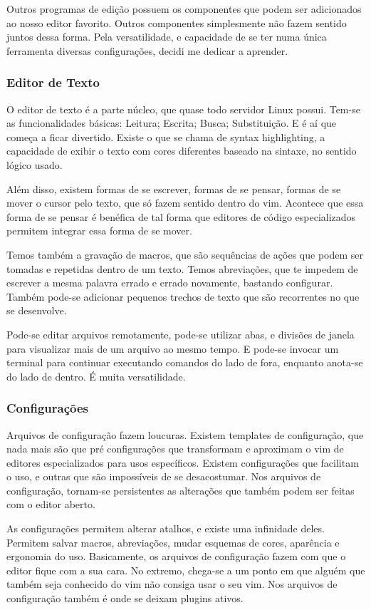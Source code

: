 \documentclass[a4paper, 12pt]{article}
\begin{document}
Outros programas de edição possuem os componentes que podem ser adicionados ao nosso editor favorito.
Outros componentes simplesmente não fazem sentido juntos dessa forma.
Pela versatilidade, e capacidade de se ter numa única ferramenta diversas configurações, decidi me dedicar a aprender.

\subsubsection{Editor de Texto}
O editor de texto é a parte núcleo, que quase todo servidor Linux possui.
Tem-se as funcionalidades básicas: Leitura; Escrita; Busca; Substituição.
E é aí que começa a ficar divertido.
Existe o que se chama de syntax highlighting, a capacidade de exibir o texto com cores diferentes baseado na sintaxe, no sentido lógico usado.

Além disso, existem formas de se escrever, formas de se pensar, formas de se mover o cursor pelo texto, que só fazem sentido dentro do vim.
Acontece que essa forma de se pensar é benéfica de tal forma que editores de código especializados permitem integrar essa forma de se mover.

Temos também a gravação de macros, que são sequências de ações que podem ser tomadas e repetidas dentro de um texto.
Temos abreviações, que te impedem de escrever a mesma palavra errado e errado novamente, bastando configurar.
Também pode-se adicionar pequenos trechos de texto que são recorrentes no que se desenvolve.

Pode-se editar arquivos remotamente, pode-se utilizar abas, e divisões de janela para visualizar mais de um arquivo ao mesmo tempo.
E pode-se invocar um terminal para continuar executando comandos do lado de fora, enquanto anota-se do lado de dentro.
É muita versatilidade.

\subsubsection{Configurações}
Arquivos de configuração fazem loucuras.
Existem templates de configuração, que nada mais são que pré configurações que transformam e aproximam o vim de editores especializados para usos específicos.
Existem configurações que facilitam o uso, e outras que são impossíveis de se desacostumar.
Nos arquivos de configuração, tornam-se persistentes as alterações que também podem ser feitas com o editor aberto.

As configurações permitem alterar atalhos, e existe uma infinidade deles.
Permitem salvar macros, abreviações, mudar esquemas de cores, aparência e ergonomia do uso.
Basicamente, os arquivos de configuração fazem com que o editor fique com a sua cara.
No extremo, chega-se a um ponto em que alguém que também seja conhecido do vim não consiga usar o seu vim. Nos arquivos de configuração também é onde se deixam plugins ativos.
\end{document}
